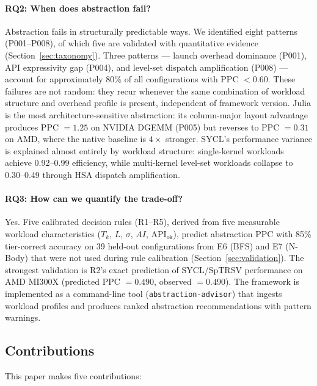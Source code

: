 \paragraph{RQ2: When does abstraction fail?}
Abstraction fails in structurally predictable ways. We identified eight
patterns (P001--P008), of which five are validated with quantitative
evidence (Section~\ref{sec:taxonomy}). Three patterns --- launch overhead
dominance (P001), API expressivity gap (P004), and level-set dispatch
amplification (P008) --- account for approximately 80\% of all
configurations with PPC $< 0.60$. These failures are not random: they
recur whenever the same combination of workload structure and overhead
profile is present, independent of framework version. Julia is the most
architecture-sensitive abstraction: its column-major layout advantage
produces PPC $= 1.25$ on NVIDIA DGEMM (P005) but reverses to PPC $= 0.31$
on AMD, where the native baseline is $4\times$ stronger. SYCL's
performance variance is explained almost entirely by workload structure:
single-kernel workloads achieve 0.92--0.99 efficiency, while multi-kernel
level-set workloads collapse to 0.30--0.49 through HSA dispatch
amplification.

\paragraph{RQ3: How can we quantify the trade-off?}
Yes. Five calibrated decision rules (R1--R5), derived from five measurable
workload characteristics ($T_k$, $L$, $\sigma$, $AI$,
$\text{API}_{\text{ok}}$), predict abstraction PPC with 85\%
tier-correct accuracy on 39 held-out configurations from E6 (BFS) and
E7 (N-Body) that were not used during rule calibration
(Section~\ref{sec:validation}). The strongest validation is R2's exact
prediction of SYCL/SpTRSV performance on AMD MI300X (predicted PPC
$= 0.490$, observed $= 0.490$). The framework is implemented as a
command-line tool (\texttt{abstraction-advisor}) that ingests workload
profiles and produces ranked abstraction recommendations with pattern
warnings.

\subsection*{Contributions}

This paper makes five contributions:

